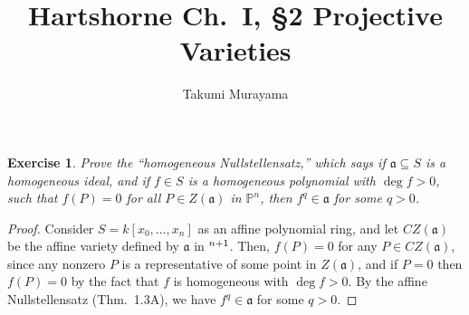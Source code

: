 \documentclass[12pt,letterpaper]{article}
\title{Hartshorne Ch.~I, \S2 Projective Varieties}
\author{Takumi Murayama}
\newtheorem{problem}{Exercise}[section]
\theoremstyle{definition}
\theoremstyle{remark}
\numberwithin{equation}{section}
\numberwithin{figure}{problem}
\let\AA\relax
\DeclareMathOperator{\AA}{\mathbb{A}}
\newcommand{\PP}{\mathbb{P}}
\begin{document}
\maketitle
\setcounter{section}{2}
\begin{problem}\label{exc:2.1}
  Prove the ``homogeneous Nullstellensatz,'' which says if $\mathfrak{a}
  \subseteq S$ is a homogeneous ideal, and if $f \in S$ is a homogeneous
  polynomial with $\deg f > 0$, such that $f(P) = 0$ for all $P \in
  Z(\mathfrak{a})$ in $\PP^n$, then $f^q \in \mathfrak{a}$ for some $q >
  0$.
\end{problem}
\begin{proof}
  Consider $S = k[x_0,\ldots,x_n]$ as an affine polynomial ring, and let
  $CZ(\mathfrak{a})$ be the affine variety defined by $\mathfrak{a}$ in
  $\AA^{n+1}$.
  Then, $f(P) = 0$ for any $P \in CZ(\mathfrak{a})$, since any nonzero $P$ is a
  representative of some point in $Z(\mathfrak{a})$, and if $P=0$ then $f(P) =
  0$ by the fact that $f$ is homogeneous with $\deg f > 0$.
  By the affine Nullstellensatz (Thm.~1.3A), we have $f^q \in \mathfrak{a}$ for
  some $q > 0$.
\end{proof}
\end{document}

